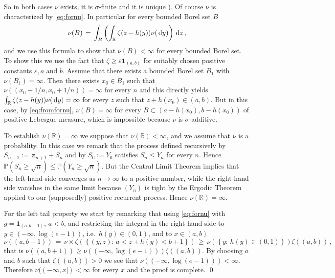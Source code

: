 \documentclass[reqno,11pt]{amsart}
\numberwithin{equation}{section}
\newcommand{\ind}{\mathbf{1}}
\newcommand{\dd}{\,\text{\rm d}}             %
\newcommand{\bbP}{{\ensuremath{\mathbb P}} }
\newcommand{\bbR}{{\ensuremath{\mathbb R}} }
\newcommand{\gep}{\varepsilon}       %
\newcommand{\gz}{\zeta}
\newcommand{\gs}{\sigma}
\newcommand{\logZ}{\mathtt{z}}
\begin{document}
 So in both cases
$\nu$ exists, it is $\gs$-finite and it is unique
 \cite[Th.~10.4.9]{cf:MT}). Of course 
 $\nu$ is characterized by \eqref{eq:fornu}.
In particular for every bounded Borel set $B$
\begin{equation}
\label{eq:fromfornu}
\nu (B)\, =\, \int_B \left(\int_ \bbR \gz (z-h(y)) \nu (\dd y) \right) \dd z\, ,
\end{equation}
and we use this formula to show that $\nu(B)< \infty$ for every bounded Borel set.
To show this we use  the fact that $\gz \ge \gep \ind_{(a, b)}$ for suitably chosen positive constants $\gep, a$ and $b$. Assume that there exists a bounded Borel set $B_1$ with $\nu(B_1)=\infty$. Then there exists $x_0\in B_1$ such that $\nu ((x_0-1/n, x_0+1/n))=\infty$ for every $n$ and this directly yields $\int_ \bbR \gz (z-h(y)) \nu (\dd y) =\infty$ for every $z$ such that $z+h(x_0)\in (a,b)$.
But in this case, by \eqref{eq:fromfornu}, $\nu(B)=\infty$ for every $B \subset (a-h(x_0),b-h(x_0))$ of positive Lebesgue measure, which is impossible because $\nu$ is $\gs$-additive.   

 
To establish $\nu (\bbR) = \infty$
we suppose that $\nu (\bbR) < \infty$,  and we assume that $\nu$ is a probability. In this case we remark that the process defined  recursively by
 $
S_{n+1}:=\,  \logZ_{n+1} + S_n
$ and by $S_0:= Y_0$
satisfies $S_n \le Y_n$ for every $n$. Hence $\bbP(S_n \ge \sqrt{n})\le \bbP(Y_n \ge \sqrt{n})$.
But the Central Limit Theorem implies that the left-hand side converges as $n \to \infty$ to a positive number,
while the right-hand side vanishes in the same limit because $(Y_n)$ is tight by the Ergodic Theorem applied to our (supposedly) positive recurrent process. Hence $\nu (\bbR) =\infty$. 

For the left tail property 
we start by remarking that using \eqref{eq:fornu} with  $g=\ind_{(a, b+1)}$,  $a<b$, and 
restricting the integral in the right-hand side to $y \in (-\infty, \log(e-1))$, i.e.\ 
 $h(y)\in(0,1)$, and to $x \in (a,b)$ 
\begin{equation}
\label{eq:fornu-lb}
\nu((a,b+1))\, = \, \nu \times \gz\left( \left\{(y,z):\, a < z+h(y)< b+1 \right\}\right)
\, \ge \, \nu \left( \left\{y:\, h(y)\in (0,1) \right\}\right)\gz((a,b))\, ,
\end{equation}
that is
$\nu((a, b+1)) \ge \nu((-\infty, \log (e-1)))\gz((a, b)) $. By choosing $a$ and $b$ such that $\gz((a, b))>0$ we see that
 $\nu((-\infty, \log (e-1)))< \infty$.  Therefore $\nu((-\infty, x])< \infty$ for every $x$ and the proof is complete.
 \qed
 
\end{document}
